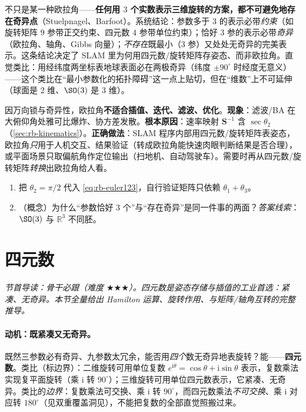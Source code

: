\begin{insight}
不只是某一种欧拉角——\textbf{任何用 $3$ 个实数表示三维旋转的方案，都不可避免地存在奇异点}（Stuelpnagel\cite{stuelpnagel1964parametrization}、Barfoot\cite{barfoot2024state}）。系统结论：参数多于 $3$ 的表示必带\emph{约束}（如旋转矩阵 $9$ 参带正交约束、四元数 $4$ 参带单位约束）；恰好 $3$ 参的表示必带\emph{奇异}（欧拉角、轴角、Gibbs 向量）；\emph{不存在}既最小（$3$ 参）又处处无奇异的完美表示。这条结论决定了 SLAM 里为何用四元数/旋转矩阵存姿态、而非欧拉角。直觉类比：用经纬度两坐标表地球表面必在两极奇异（纬度 $\pm90^\circ$ 时经度无意义）——这个类比在“最小参数化的拓扑障碍”这一点上贴切，但在“维数”上不可延伸（球面是 $2$ 维、$\SO(3)$ 是 $3$ 维）。
\end{insight}

\begin{pitfall}
因万向锁与奇异性，欧拉角\textbf{不适合插值、迭代、滤波、优化}。\textbf{现象}：滤波/BA 在大俯仰角处雅可比爆炸、协方差发散。\textbf{根本原因}：速率映射 $\mathbf{S}^{-1}$ 含 $\sec\theta_2$（\cref{sec:rb-kinematics}）。\textbf{正确做法}：SLAM 程序内部用四元数/旋转矩阵表姿态，欧拉角\emph{只}用于人机交互、结果验证（转成欧拉角能快速肉眼判断结果是否合理），或平面场景只取偏航角作定位输出（扫地机、自动驾驶车）。需要时再从四元数/旋转矩阵\emph{转换}出欧拉角给人看。
\end{pitfall}

\begin{practice}
\begin{enumerate}
  \item 把 $\theta_2=\pi/2$ 代入 \cref{eq:rb-euler123}，自行验证矩阵只依赖 $\theta_1+\theta_3$。
  \item （概念）为什么“参数恰好 $3$ 个”与“存在奇异”是同一件事的两面？\emph{答案线索}：$\SO(3)$ 与 $\mathbb{R}^3$ 不同胚。
\end{enumerate}
\end{practice}

\section{四元数}
\label{sec:rb-quat}
\noindent\emph{节首导读：骨干必跟（难度 $\bigstar\bigstar\bigstar$）。四元数是姿态\emph{存储与插值}的工业首选：紧凑、无奇异。本节全量给出 Hamilton 运算、旋转作用、与矩阵/轴角互转的完整推导。}

\paragraph{动机：既紧凑又无奇异。}既然三参数必有奇异、九参数太冗余，能否用\emph{四个}数无奇异地表旋转？能——\textbf{四元数}\cite{gaoxiang2019slam14}。类比（标边界）：二维旋转可用单位复数 $e^{\mathrm{i}\theta}=\cos\theta+\mathrm{i}\sin\theta$ 表示，复数乘法实现复平面旋转（乘 $\mathrm{i}$ 转 $90^\circ$）；三维旋转可用单位四元数表示，它紧凑、无奇异。类比的\emph{边界}：复数乘法可交换、乘 $\mathrm{i}$ 转 $90^\circ$，而四元数乘法\emph{不可交换}、乘 $\mathrm{i}$ 对应转 $180^\circ$（见双重覆盖洞见），不能把复数的全部直觉照搬过来。

